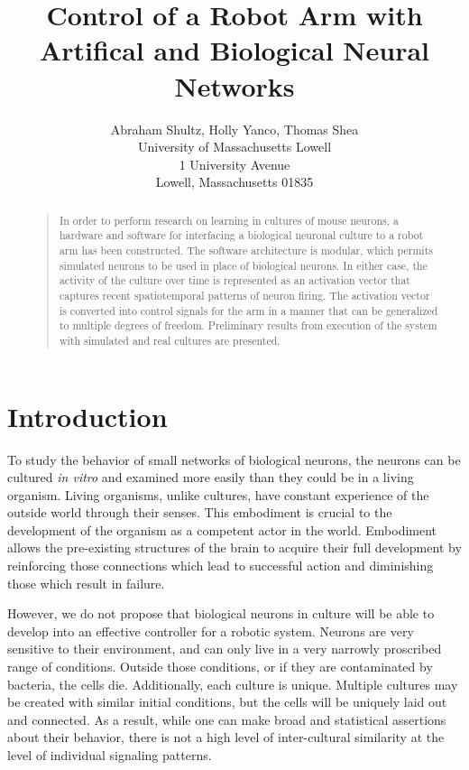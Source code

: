 \documentclass[letterpaper]{article}
\begin{document}
%
\title{Control of a Robot Arm with Artifical and Biological Neural Networks}
\author{Abraham Shultz, Holly Yanco, Thomas Shea\\
University of Massachusetts Lowell\\
1 University Avenue\\
Lowell, Massachusetts 01835\\
}
\maketitle
\begin{abstract}
\begin{quote}
In order to perform research on learning in cultures of mouse neurons, a hardware and software for interfacing a biological neuronal culture to a robot arm has been constructed. 
The software architecture is modular, which permits simulated neurons to be used in place of biological neurons. 
In either case, the activity of the culture over time is represented as an activation vector that captures recent spatiotemporal patterns of neuron firing. 
The activation vector is converted into control signals for the arm in a manner that can be generalized to multiple degrees of freedom. 
Preliminary results from execution of the system with simulated and real cultures are presented. 
\end{quote}
\end{abstract}

\section{Introduction}

To study the behavior of small networks of biological neurons, the neurons can be cultured \textit{in vitro} and examined more easily than they could be in a living organism. 
Living organisms, unlike cultures, have constant experience of the outside world through their senses. 
This embodiment is crucial to the development of the organism as a competent actor in the world.
Embodiment allows the pre-existing structures of the brain to acquire their full development by reinforcing those connections which lead to successful action and diminishing those which result in failure. 

However, we do not propose that biological neurons in culture will be able to develop into an effective controller for a robotic system.
Neurons are very sensitive to their environment, and can only live in a very narrowly proscribed range of conditions. 
Outside those conditions, or if they are contaminated by bacteria, the cells die. 
Additionally, each culture is unique. Multiple cultures may be created with similar initial conditions, but the cells will be uniquely laid out and connected. 
As a result, while one can make broad and statistical assertions about their behavior, there is not a high level of inter-cultural similarity at the level of individual signaling patterns. 
\end{document}

